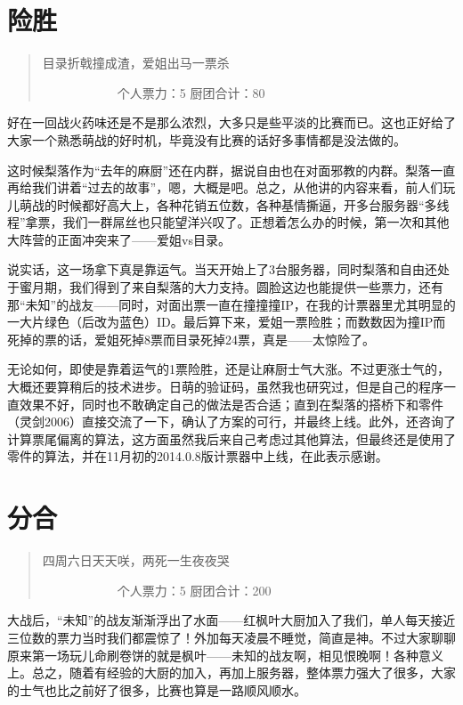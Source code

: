 \chapter{险胜}
\begin{quote}
目录折戟撞成渣，爱姐出马一票杀

　　　　　　个人票力：5 厨团合计：80
\end{quote}

好在一回战火药味还是不是那么浓烈，大多只是些平淡的比赛而已。这也正好给了大家一个熟悉萌战的好时机，毕竟没有比赛的话好多事情都是没法做的。

这时候梨落作为“去年的麻厨”还在内群，据说自由也在对面邪教的内群。梨落一直再给我们讲着“过去的故事”，嗯，大概是吧。总之，从他讲的内容来看，前人们玩儿萌战的时候都好高大上，各种花销五位数，各种基情撕逼，开多台服务器“多线程”拿票，我们一群屌丝也只能望洋兴叹了。正想着怎么办的时候，第一次和其他大阵营的正面冲突来了——爱姐vs目录。

说实话，这一场拿下真是靠运气。当天开始上了3台服务器，同时梨落和自由还处于蜜月期，我们得到了来自梨落的大力支持。圆脸这边也能提供一些票力，还有那“未知”的战友——同时，对面出票一直在撞撞撞IP，在我的计票器里尤其明显的一大片绿色（后改为蓝色）ID。最后算下来，爱姐一票险胜；而数数因为撞IP而死掉的票的话，爱姐死掉8票而目录死掉24票，真是——太惊险了。

无论如何，即使是靠着运气的1票险胜，还是让麻厨士气大涨。不过更涨士气的，大概还要算稍后的技术进步。日萌的验证码，虽然我也研究过，但是自己的程序一直效果不好，同时也不敢确定自己的做法是否合适；直到在梨落的搭桥下和零件（灵剑2006）直接交流了一下，确认了方案的可行，并最终上线。此外，还咨询了计算票尾偏离的算法，这方面虽然我后来自己考虑过其他算法，但最终还是使用了零件的算法，并在11月初的2014.0.8版计票器中上线，在此表示感谢。


\chapter{分合}
\begin{quote}
四周六日天天咲，两死一生夜夜哭

　　　　　　个人票力：5 厨团合计：200
\end{quote}

大战后，“未知”的战友渐渐浮出了水面——红枫叶大厨加入了我们，单人每天接近三位数的票力当时我们都震惊了！外加每天凌晨不睡觉，简直是神。不过大家聊聊原来第一场玩儿命刷卷饼的就是枫叶——未知的战友啊，相见恨晚啊！各种意义上。总之，随着有经验的大厨的加入，再加上服务器，整体票力强大了很多，大家的士气也比之前好了很多，比赛也算是一路顺风顺水。

